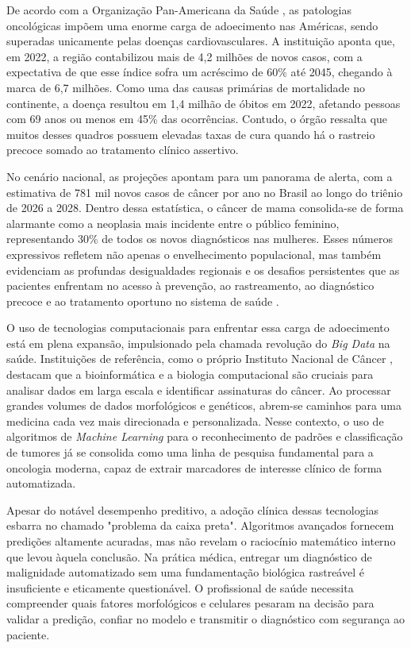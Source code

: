 \documentclass[
    12pt
    ,oneside
    ,a4paper
    ,chapter=TITLE
    ,section=TITLE
    ,sumario=abnt-6027-2012
    ,english,brazil]{abntex2} %
\begin{document}
De acordo com a Organização Pan-Americana da Saúde \cite{Paho-cancer}, as patologias oncológicas impõem uma enorme carga de adoecimento nas Américas, sendo superadas unicamente pelas doenças cardiovasculares. A instituição aponta que, em 2022, a região contabilizou mais de 4,2 milhões de novos casos, com a expectativa de que esse índice sofra um acréscimo de 60\% até 2045, chegando à marca de 6,7 milhões. Como uma das causas primárias de mortalidade no continente, a doença resultou em 1,4 milhão de óbitos em 2022, afetando pessoas com 69 anos ou menos em 45\% das ocorrências. Contudo, o órgão ressalta que muitos desses quadros possuem elevadas taxas de cura quando há o rastreio precoce somado ao tratamento clínico assertivo.

No cenário nacional, as projeções apontam para um panorama de alerta, com a estimativa de 781 mil novos casos de câncer por ano no Brasil ao longo do triênio de 2026 a 2028. Dentro dessa estatística, o câncer de mama consolida-se de forma alarmante como a neoplasia mais incidente entre o público feminino, representando 30\% de todos os novos diagnósticos nas mulheres. Esses números expressivos refletem não apenas o envelhecimento populacional, mas também evidenciam as profundas desigualdades regionais e os desafios persistentes que as pacientes enfrentam no acesso à prevenção, ao rastreamento, ao diagnóstico precoce e ao tratamento oportuno no sistema de saúde \cite{Inca-781}.

O uso de tecnologias computacionais para enfrentar essa carga de adoecimento está em plena expansão, impulsionado pela chamada revolução do \textit{Big Data} na saúde. Instituições de referência, como o próprio Instituto Nacional de Câncer \cite{Inca-informatica}, destacam que a bioinformática e a biologia computacional são cruciais para analisar dados em larga escala e identificar assinaturas do câncer. Ao processar grandes volumes de dados morfológicos e genéticos, abrem-se caminhos para uma medicina cada vez mais direcionada e personalizada. Nesse contexto, o uso de algoritmos de \textit{Machine Learning} para o reconhecimento de padrões e classificação de tumores já se consolida como uma linha de pesquisa fundamental para a oncologia moderna, capaz de extrair marcadores de interesse clínico de forma automatizada.

Apesar do notável desempenho preditivo, a adoção clínica dessas tecnologias esbarra no chamado "problema da caixa preta". Algoritmos avançados fornecem predições altamente acuradas, mas não revelam o raciocínio matemático interno que levou àquela conclusão. Na prática médica, entregar um diagnóstico de malignidade automatizado sem uma fundamentação biológica rastreável é insuficiente e eticamente questionável. O profissional de saúde necessita compreender quais fatores morfológicos e celulares pesaram na decisão para validar a predição, confiar no modelo e transmitir o diagnóstico com segurança ao paciente.
\end{document}
